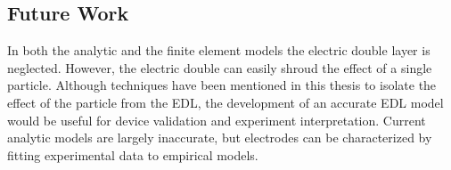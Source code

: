 



\subsection*{Future Work}

\par In both the analytic and the finite element models the electric double layer is neglected. However, the electric double can easily shroud the effect of a single particle. Although techniques have been mentioned in this thesis to isolate the effect of the particle from the EDL, the development of an accurate EDL model would be useful for device validation and experiment interpretation. Current analytic models are largely inaccurate, but electrodes can be characterized by fitting experimental data to empirical models. 


